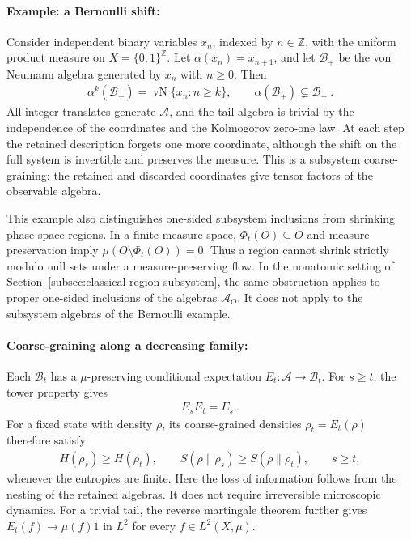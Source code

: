 \documentclass[a4paper,11pt]{article}
\theoremstyle{definition}
\newcommand{\mA}{\mathcal{A}}
\newcommand{\mB}{\mathcal{B}}
\begin{document}
\paragraph{Example: a Bernoulli shift:}
Consider independent binary variables $x_n$, indexed by $n\in\mathbb Z$, with the uniform product measure on $X=\{0,1\}^{\mathbb Z}$. Let $\alpha(x_n)=x_{n+1}$, and let $\mB_+$ be the von Neumann algebra generated by $x_n$ with $n\geq0$. Then
\begin{align}
    \alpha^k(\mB_+)
    =\operatorname{vN}\{x_n:n\geq k\},
    \qquad
    \alpha(\mB_+)\subsetneq\mB_+\ .
\end{align}
All integer translates generate $\mA$, and the tail algebra is trivial by the independence of the coordinates and the Kolmogorov zero-one law. At each step the retained description forgets one more coordinate, although the shift on the full system is invertible and preserves the measure. This is a subsystem coarse-graining: the retained and discarded coordinates give tensor factors of the observable algebra.

This example also distinguishes one-sided subsystem inclusions from shrinking phase-space regions. In a finite measure space, $\Phi_t(O)\subseteq O$ and measure preservation imply $\mu(O\setminus\Phi_t(O))=0$. Thus a region cannot shrink strictly modulo null sets under a measure-preserving flow. In the nonatomic setting of Section~\ref{subsec:classical-region-subsystem}, the same obstruction applies to proper one-sided inclusions of the algebras $\mA_O$. It does not apply to the subsystem algebras of the Bernoulli example.

\paragraph{Coarse-graining along a decreasing family:}
Each $\mB_t$ has a $\mu$-preserving conditional expectation $E_t:\mA\to\mB_t$. For $s\geq t$, the tower property gives
\begin{align}
    E_sE_t=E_s\ .
\end{align}
For a fixed state with density $\rho$, its coarse-grained densities $\rho_t=E_t(\rho)$ therefore satisfy
\begin{align}
    H(\rho_s)\geq H(\rho_t),
    \qquad
    S(\rho\|\rho_s)\geq S(\rho\|\rho_t),
    \qquad s\geq t,
\end{align}
whenever the entropies are finite. Here the loss of information follows from the nesting of the retained algebras. It does not require irreversible microscopic dynamics. For a trivial tail, the reverse martingale theorem further gives $E_t(f)\to\mu(f)1$ in $L^2$ for every $f\in L^2(X,\mu)$.
\end{document}
